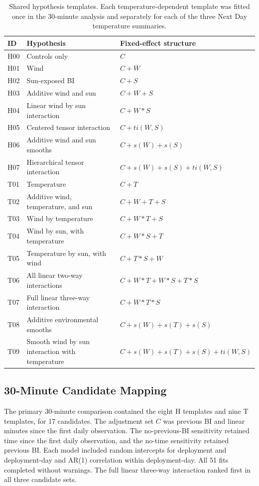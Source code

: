 \documentclass[insects,article,submit,pdftex,moreauthors]{Definitions/mdpi}
\begin{document}
\begin{appendix}
\begin{table}[H]
\caption{Shared hypothesis templates. Each temperature-dependent template was fitted once in the 30-minute analysis and separately for each of the three Next Day temperature summaries.}
\label{tab:harmonized_templates}
\begin{tabularx}{\textwidth}{@{}p{}p{}X@{}}
\toprule
\textbf{ID} & \textbf{Hypothesis} & \textbf{Fixed-effect structure} \\
\midrule
H00 & Controls only & $C$ \\
H01 & Wind & $C + W$ \\
H02 & Sun-exposed BI & $C + S$ \\
H03 & Additive wind and sun & $C + W + S$ \\
H04 & Linear wind by sun interaction & $C + W * S$ \\
H05 & Centered tensor interaction & $C + ti(W,S)$ \\
H06 & Additive wind and sun smooths & $C + s(W) + s(S)$ \\
H07 & Hierarchical tensor interaction & $C + s(W) + s(S) + ti(W,S)$ \\
T01 & Temperature & $C + T$ \\
T02 & Additive wind, temperature, and sun & $C + W + T + S$ \\
T03 & Wind by temperature & $C + W * T + S$ \\
T04 & Wind by sun, with temperature & $C + W * S + T$ \\
T05 & Temperature by sun, with wind & $C + T * S + W$ \\
T06 & All linear two-way interactions & $C + W * T + W * S + T * S$ \\
T07 & Full linear three-way interaction & $C + W * T * S$ \\
T08 & Additive environmental smooths & $C + s(W) + s(T) + s(S)$ \\
T09 & Smooth wind by sun interaction with temperature & $C + s(W) + s(T) + s(S) + ti(W,S)$ \\
\bottomrule
\end{tabularx}
\end{table}

\subsection{30-Minute Candidate Mapping}
\label{app:30min_models}

The primary 30-minute comparison contained the eight H templates and nine T templates, for 17 candidates. The adjustment set $C$ was previous BI and linear minutes since the first daily observation. The no-previous-BI sensitivity retained time since the first daily observation, and the no-time sensitivity retained previous BI. Each model included random intercepts for deployment and deployment-day and AR(1) correlation within deployment-day. All 51 fits completed without warnings. The full linear three-way interaction ranked first in all three candidate sets.


\end{appendix}
\end{document}
